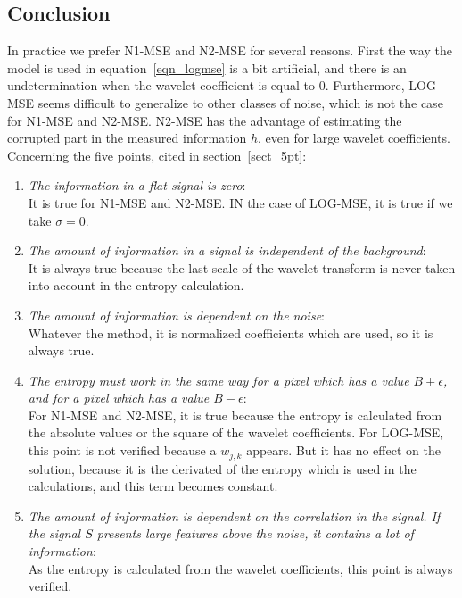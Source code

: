 \subsection{Conclusion}

In practice we prefer N1-MSE and N2-MSE for several reasons. First the way
the model is used in equation~\ref{eqn_logmse} is a bit artificial, and  
there is an undetermination when the wavelet coefficient is equal to 0.
Furthermore, LOG-MSE seems difficult to generalize to other classes of noise,
which is not the case for N1-MSE and N2-MSE. N2-MSE has the advantage of 
estimating the corrupted part in the measured information $h$, even for large
wavelet coefficients.
Concerning the five points, cited in section~\ref{sect_5pt}:
\begin{enumerate}
\item {\em The information in a flat signal is zero}: \\
 It is true for N1-MSE and N2-MSE. IN the case of LOG-MSE, it is true
if we take $\sigma=0$.
\item {\em The amount of information in a signal is independent 
of the background}: \\
It is always true because the last scale of the wavelet transform is
never taken into account in the entropy calculation.
\item {\em The amount of information is dependent on the noise}: \\
Whatever the method, it is normalized coefficients which are used, so it
is always true.
\item {\em The entropy must work in the same way for a pixel which
has a value $B + \epsilon$, and
for a pixel which has a value $B - \epsilon$}: \\
For N1-MSE and N2-MSE, it is true because the entropy is calculated
from the absolute values or the square of the wavelet coefficients.
For LOG-MSE, this point is not verified because a $w_{j,k}$ appears.
But it has no effect on the solution, because it is the 
derivated of the entropy which is used in the calculations,
and this term becomes constant.
\item {\em The amount of information is dependent on the correlation in the signal.
If the signal $S$  presents large features above the noise, it contains
a lot of information}: \\
As the entropy is calculated from the wavelet coefficients, this point 
is always verified.
\end{enumerate}
